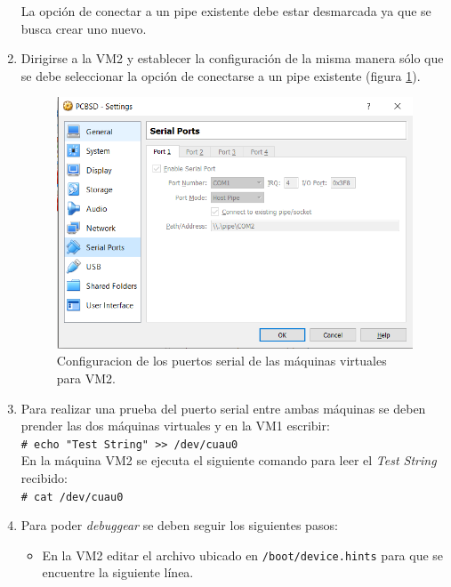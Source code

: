 \documentclass[a4paper]{book}
\begin{document}
\begin{enumerate}
La opci\'on de conectar a un pipe existente debe estar desmarcada ya que se busca crear  uno nuevo.\\
\item Dirigirse a la VM2 y establecer la configuraci\'on de la misma manera s\'olo que se debe seleccionar la opci\'on de conectarse a un pipe existente (figura \ref{Fig:conf2}).\\

\begin{figure}
	\begin{center}
		\includegraphics[scale=0.7]{./imagenes/configuracionserial2.png}
		\caption{Configuracion de los puertos serial de las m\'aquinas virtuales para VM2.}
		\label{Fig:conf2}
	\end{center}
\end{figure}

\item Para realizar una prueba del puerto serial entre ambas máquinas se deben prender las dos máquinas virtuales y en la VM1 escribir:\\

\verb|# echo "Test String" >> /dev/cuau0|\\

En la m\'aquina VM2 se ejecuta el siguiente comando para leer el \emph{Test String} recibido:\\

\verb|# cat /dev/cuau0|\\

\item Para poder \emph{debuggear} se deben seguir los siguientes pasos:
\begin{itemize}
\item En la VM2 editar el archivo ubicado en \verb|/boot/device.hints| para que se encuentre la siguiente línea.\\


\end{itemize}
\end{enumerate}
\end{document}
